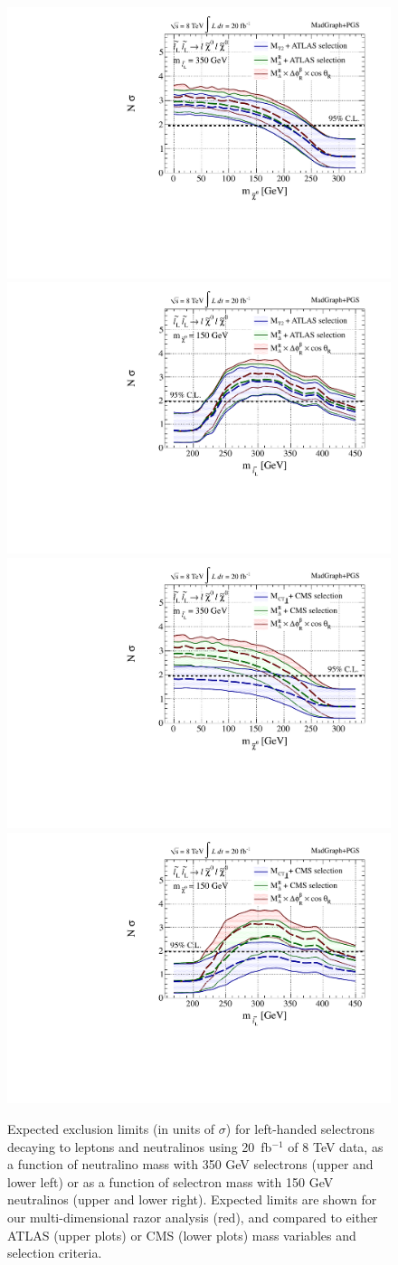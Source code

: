 \begin{figure}[!ht]
\includegraphics[width=0.40\columnwidth]{fig/sectionV/LIMIT1D_sleptonL_ATLAS_ML350.pdf}
\includegraphics[width=0.40\columnwidth]{fig/sectionV/LIMIT1D_sleptonL_ATLAS_MX150.pdf}
\includegraphics[width=0.40\columnwidth]{fig/sectionV/LIMIT1D_sleptonL_CMS_ML350.pdf}
\includegraphics[width=0.40\columnwidth]{fig/sectionV/LIMIT1D_sleptonL_CMS_MX150.pdf}
\caption{Expected exclusion limits (in units of $\sigma$) for left-handed selectrons decaying to leptons and neutralinos using 20~fb$^{-1}$ of 8 TeV data, as a function of neutralino mass with 350 GeV selectrons (upper and lower left) or as a function of selectron mass with 150 GeV neutralinos (upper and lower right). Expected limits are shown for our multi-dimensional razor analysis (red), and compared to either ATLAS (upper plots) or CMS (lower plots) mass variables and selection criteria. \label{fig:results_slepton_1D_compare}}
\end{figure}

